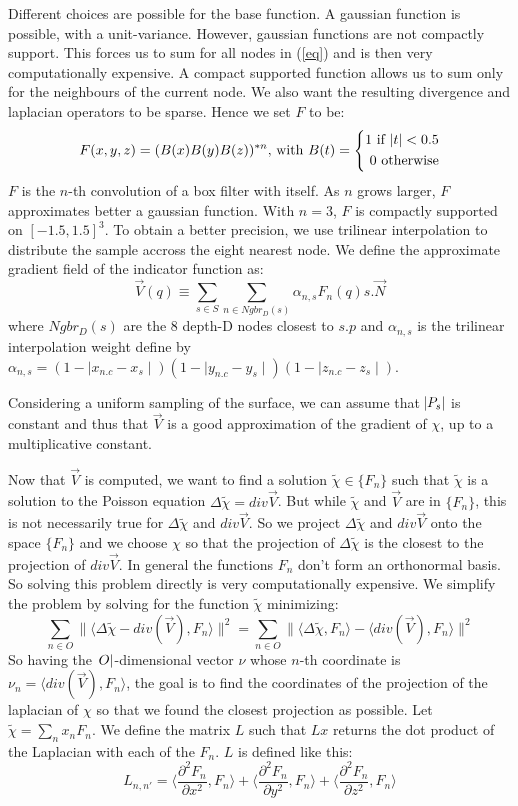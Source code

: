\documentclass[12pt]{article}
\begin{document}
Different choices are possible for the base function. A gaussian function is possible, with a unit-variance. However, gaussian functions are not compactly support. This forces us to sum for all nodes in (\ref{eq}) and is then very computationally expensive. A compact supported function allows us to sum only for the neighbours of the current node. We also want the resulting divergence and laplacian operators to be sparse. Hence we set $F$ to be:
$$F(x,y,z) = (B(x)B(y)B(z))^{*n}\text{, with }B(t) = \left\{
      \begin{aligned}
        1\text{ if }\abs{t}<0.5 \\
        0 \text{ otherwise}
      \end{aligned}
    \right.
$$
$F$ is the $n$-th convolution of a box filter with itself. As $n$ grows larger, $F$ approximates better a gaussian function. With $n = 3$,  $F$ is compactly supported on $[-1.5, 1.5]^3$.
To obtain a better precision, we use trilinear interpolation to distribute the sample accross the eight nearest node. We define the approximate gradient field of the indicator function as:
$$\vec{V}(q) \equiv \sum_{s \in S} \sum_{n \in Ngbr_D(s)} \alpha_{n,s}F_n(q)s.\vec{N}$$
where $Ngbr_D(s)$ are the 8 depth-D nodes closest to $s.p$ and $\alpha_{n,s}$ is the trilinear interpolation weight define by $\alpha_{n,s} = (1 - \mid{}x_{n.c} - x_s \mid)(1 - \mid y_{n.c} - y_s\mid)(1 - \mid z_{n.c} - z_s\mid)$.

Considering a uniform sampling of the surface, we can assume that $\abs{P_s}$ is constant and thus that $\vec{V}$ is a good approximation of the gradient of $\chi$, up to a multiplicative constant.

Now that $\vec{V}$ is computed, we want to find a solution $\tilde{\chi} \in \{F_n\}$ such that $\tilde{\chi}$ is a solution to the Poisson equation $\Delta\tilde{\chi} = div{\vec{V}}$. But while $\tilde{\chi}$ and $\vec{V}$ are in $\{F_n\}$, this is not necessarily true for $\Delta\tilde{\chi}$ and $div{\vec{V}}$. So we project $\Delta\tilde{\chi}$ and $div{\vec{V}}$ onto the space $\{F_n\}$ and we choose $\chi$ so that the projection of $\Delta\tilde{\chi}$ is the closest to the projection of $div{\vec{V}}$. In general the functions $F_n$ don't form an orthonormal basis. So solving this problem directly is very computationally expensive. We simplify the problem by solving for the function $\tilde{\chi}$ minimizing:
$$\sum_{n \in O}\|\langle\Delta\tilde{\chi}-div(\vec{V}),F_n\rangle\|^2 = \sum_{n \in O}\|\langle\Delta\tilde{\chi},F_n\rangle - \langle div(\vec{V}), F_n\rangle\|^2$$
So having the $\abs{O}$-dimensional vector $\nu$ whose $n$-th coordinate is $\nu_n = \langle div(\vec{V}), F_n\rangle$, the goal is to find the coordinates of the projection of the laplacian of $\chi$ so that we found the closest projection as possible. Let $\tilde{\chi} = \sum_n x_n F_n$. We define the matrix $L$ such that $Lx$ returns the dot product of the Laplacian with each of the $F_n$. $L$ is defined like this:
$$L_{n,n'} = \langle\frac{\partial^2F_n}{\partial x^2}, F_n\rangle + \langle\frac{\partial^2F_n}{\partial y^2}, F_n\rangle + \langle\frac{\partial^2F_n}{\partial z^2}, F_n\rangle$$ 
\end{document}
